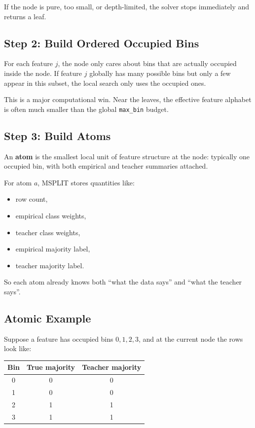 \documentclass[11pt]{article}
\begin{document}
If the node is pure, too small, or depth-limited, the solver stops immediately and returns a leaf.

\subsection{Step 2: Build Ordered Occupied Bins}

For each feature \(j\), the node only cares about bins that are actually occupied inside the node. If feature \(j\) globally has many possible bins but only a few appear in this subset, the local search only uses the occupied ones.

This is a major computational win. Near the leaves, the effective feature alphabet is often much smaller than the global \texttt{max\_bin} budget.

\subsection{Step 3: Build Atoms}

An \textbf{atom} is the smallest local unit of feature structure at the node: typically one occupied bin, with both empirical and teacher summaries attached.

For atom \(a\), MSPLIT stores quantities like:

\begin{itemize}
\item row count,
\item empirical class weights,
\item teacher class weights,
\item empirical majority label,
\item teacher majority label.
\end{itemize}

So each atom already knows both ``what the data says'' and ``what the teacher says''.

\subsection{Atomic Example}

Suppose a feature has occupied bins \(0,1,2,3\), and at the current node the rows look like:

\begin{center}
\begin{tabular}{|c|c|c|}
\hline
Bin & True majority & Teacher majority \\
\hline
0 & 0 & 0 \\
1 & 0 & 0 \\
2 & 1 & 1 \\
3 & 1 & 1 \\
\hline
\end{tabular}
\end{center}
\end{document}
